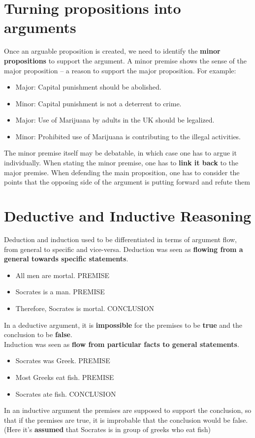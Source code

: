 \documentclass{article}
\begin{document}
\section{Turning propositions into arguments}
\begin{flushleft}
Once an arguable proposition is created, we need to identify the \textbf{minor propositions} to support the argument. A minor premise shows the sense of the major proposition – a reason to support the major proposition. For example:
\end{flushleft}
\begin{itemize}
  \item Major: Capital punishment should be abolished.
  \item Minor: Capital punishment is not a deterrent to crime. 
  \item Major: Use of Marijuana by adults in the UK should be legalized.
  \item Minor: Prohibited use of Marijuana is contributing to the illegal activities. 
\end{itemize}
\begin{flushleft}
The minor premise itself may be debatable, in which case one has to argue it individually. When stating the minor premise, one has to \textbf{link it back} to the major premise. When defending the main proposition, one has to consider the points that the opposing side of the argument is putting forward and refute them
\end{flushleft}

\section{Deductive and Inductive Reasoning}
\begin{flushleft}
Deduction and induction used to be differentiated in terms of argument flow, from general to specific and vice-versa. Deduction was seen as \textbf{flowing from a general towards specific statements}.
\begin{itemize}
  \item All men are mortal. PREMISE
  \item Socrates is a man. PREMISE
  \item Therefore, Socrates is mortal. CONCLUSION
\end{itemize}
In a deductive argument, it is \textbf{impossible} for the premises to be \textbf{true} and the conclusion to be \textbf{false}.\\
Induction was seen as \textbf{flow from particular facts to general statements}.
\begin{itemize}
  \item Socrates was Greek. PREMISE
  \item Most Greeks eat fish. PREMISE
  \item Socrates ate fish. CONCLUSION
\end{itemize}
In an inductive argument the premises are supposed to support the conclusion, so that if the premises are true, it is improbable that the conclusion would be false. (Here it's \textbf{assumed} that Socrates is in group of greeks who eat fish)
\end{flushleft}
\end{document}
